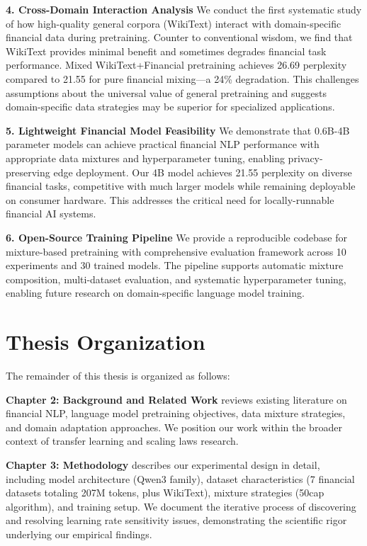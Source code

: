 \textbf{4. Cross-Domain Interaction Analysis}
We conduct the first systematic study of how high-quality general corpora (WikiText) interact with domain-specific financial data during pretraining. Counter to conventional wisdom, we find that WikiText provides minimal benefit and sometimes degrades financial task performance. Mixed WikiText+Financial pretraining achieves 26.69 perplexity compared to 21.55 for pure financial mixing—a 24\% degradation. This challenges assumptions about the universal value of general pretraining and suggests domain-specific data strategies may be superior for specialized applications.

\textbf{5. Lightweight Financial Model Feasibility}
We demonstrate that 0.6B-4B parameter models can achieve practical financial NLP performance with appropriate data mixtures and hyperparameter tuning, enabling privacy-preserving edge deployment. Our 4B model achieves 21.55 perplexity on diverse financial tasks, competitive with much larger models while remaining deployable on consumer hardware. This addresses the critical need for locally-runnable financial AI systems.

\textbf{6. Open-Source Training Pipeline}
We provide a reproducible codebase for mixture-based pretraining with comprehensive evaluation framework across 10 experiments and 30 trained models. The pipeline supports automatic mixture composition, multi-dataset evaluation, and systematic hyperparameter tuning, enabling future research on domain-specific language model training.

\section{Thesis Organization}

The remainder of this thesis is organized as follows:

\textbf{Chapter 2: Background and Related Work} reviews existing literature on financial NLP, language model pretraining objectives, data mixture strategies, and domain adaptation approaches. We position our work within the broader context of transfer learning and scaling laws research.

\textbf{Chapter 3: Methodology} describes our experimental design in detail, including model architecture (Qwen3 family), dataset characteristics (7 financial datasets totaling 207M tokens, plus WikiText), mixture strategies (50cap algorithm), and training setup. We document the iterative process of discovering and resolving learning rate sensitivity issues, demonstrating the scientific rigor underlying our empirical findings.

